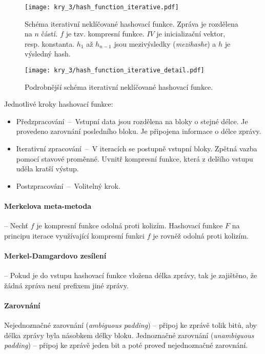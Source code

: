 \begin{figure}[H]
    \centering
    \texttt{[image: kry\_3/hash\_function\_iterative.pdf]}
    \caption{Schéma iterativní neklíčované hashovací funkce. Zpráva je rozdělena na $n$ částí. $f$ je tzv. kompresní funkce. $IV$ je inicializační vektor, resp. konstanta. $h_1$ až $h_{n-1}$ jsou mezivýsledky (\textit{mezihashe}) a $h$ je výsledný hash.}
\end{figure}

\begin{figure}[H]
    \centering
    \texttt{[image: kry\_3/hash\_function\_iterative\_detail.pdf]}
    \caption{Podrobnější schéma iterativní neklíčované hashovací funkce.}
\end{figure}

Jednotlivé kroky hashovací funkce: \begin{itemize}
    \item Předzpracování~--~Vstupní data jsou rozdělena na bloky o stejné délce. Je provedeno zarovnání posledního bloku. Je připojena informace o délce zprávy.
    \item Iterativní zpracování~--~V iteracích se postupně  vstupní bloky. Zpět\-ná vazba pomocí stavové proměnné. Uvnitř kompresní funkce, která z delšího vstupu uděla kratší výstup.
    \item Postzpracování~--~Volitelný krok.
\end{itemize}

\paragraph*{Merkelova meta-metoda} -- Nechť $f$ je kompresní funkce odolná proti kolizím. Hashovací funkce $F$ na principu iterace využívající kompresní funkci $f$ je rovněž odolná proti kolizím.

\paragraph*{Merkel-Damgardovo zesílení} -- Pokud je do vstupu hashovací funkce vložena délka zprá\-vy, tak je zajištěno, že žádná zpráva není prefixem jiné zprávy.

\paragraph*{Zarovnání} Nejednoznačné zarovnání (\textit{ambiguous padding}) -- připoj ke zprávě tolik bitů, aby délka zprávy byla násobkem délky bloku. Jednoznačné zarovnání (\textit{unambiguous padding}) -- připoj ke zprávě jeden bit a poté proveď nejednoznačné zarovnání.

